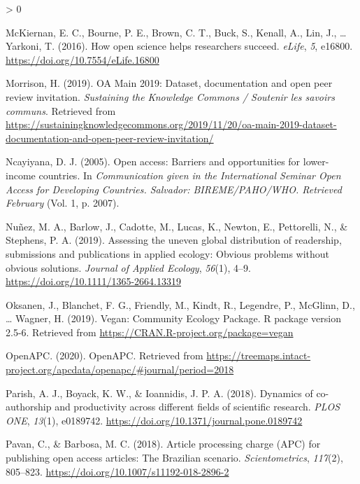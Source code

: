 \documentclass[
  english,
  man]{apa6}
\newlength{\cslhangindent}
\newenvironment{CSLReferences}[2] %
 {%
  \setlength{\parindent}{0pt}
  \ifodd #1 \everypar{\setlength{\hangindent}{\cslhangindent}}\ignorespaces\fi
  \ifnum #2 > 0
  \setlength{\parskip}{#2\baselineskip}
  \fi
 }%
 {}
\begin{document}
\begin{CSLReferences}{1}{0}
\leavevmode\hypertarget{ref-mckiernan_how_2016}{}%
McKiernan, E. C., Bourne, P. E., Brown, C. T., Buck, S., Kenall, A., Lin, J., \ldots{} Yarkoni, T. (2016). How open science helps researchers succeed. \emph{eLife}, \emph{5}, e16800. \url{https://doi.org/10.7554/eLife.16800}

\leavevmode\hypertarget{ref-morrison_oa_2019}{}%
Morrison, H. (2019). {OA} {Main} 2019: {Dataset}, documentation and open peer review invitation. \emph{Sustaining the Knowledge Commons / Soutenir les savoirs communs}. Retrieved from \url{https://sustainingknowledgecommons.org/2019/11/20/oa-main-2019-dataset-documentation-and-open-peer-review-invitation/}

\leavevmode\hypertarget{ref-ncayiyana_open_2005}{}%
Ncayiyana, D. J. (2005). Open access: Barriers and opportunities for lower-income countries. In \emph{Communication given in the {International} {Seminar} {Open} {Access} for {Developing} {Countries}. {Salvador}: {BIREME}/{PAHO}/{WHO}. {Retrieved} {February}} (Vol. 1, p. 2007).

\leavevmode\hypertarget{ref-nunez_assessing_2019}{}%
Nuñez, M. A., Barlow, J., Cadotte, M., Lucas, K., Newton, E., Pettorelli, N., \& Stephens, P. A. (2019). Assessing the uneven global distribution of readership, submissions and publications in applied ecology: {Obvious} problems without obvious solutions. \emph{Journal of Applied Ecology}, \emph{56}(1), 4--9. \url{https://doi.org/10.1111/1365-2664.13319}

\leavevmode\hypertarget{ref-oksanen_vegan_2019}{}%
Oksanen, J., Blanchet, F. G., Friendly, M., Kindt, R., Legendre, P., McGlinn, D., \ldots{} Wagner, H. (2019). Vegan: {Community} {Ecology} {Package}. {R} package version 2.5-6. Retrieved from \url{https://CRAN.R-project.org/package=vegan}

\leavevmode\hypertarget{ref-openapc_openapc_2020}{}%
OpenAPC. (2020). {OpenAPC}. Retrieved from \url{https://treemaps.intact-project.org/apcdata/openapc/\#journal/period=2018}

\leavevmode\hypertarget{ref-parish_dynamics_2018}{}%
Parish, A. J., Boyack, K. W., \& Ioannidis, J. P. A. (2018). Dynamics of co-authorship and productivity across different fields of scientific research. \emph{PLOS ONE}, \emph{13}(1), e0189742. \url{https://doi.org/10.1371/journal.pone.0189742}

\leavevmode\hypertarget{ref-pavan_article_2018}{}%
Pavan, C., \& Barbosa, M. C. (2018). Article processing charge ({APC}) for publishing open access articles: The {Brazilian} scenario. \emph{Scientometrics}, \emph{117}(2), 805--823. \url{https://doi.org/10.1007/s11192-018-2896-2}


\end{CSLReferences}
\end{document}
